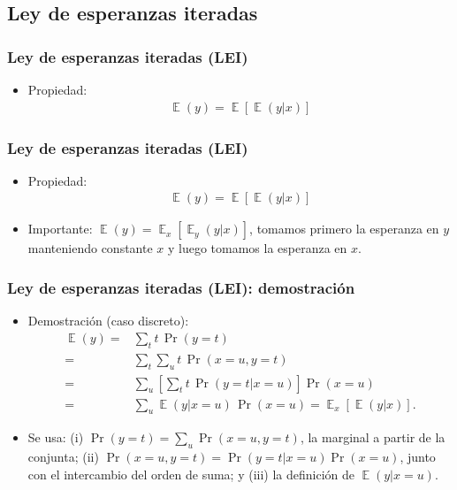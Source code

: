 \documentclass[t, compress, spanish, aspectratio=169]{beamer}
\DeclareMathOperator{\E}{\mathbb{E}}
\begin{document}
    \subsection{Ley de esperanzas iteradas}
    \begin{frame}
        \frametitle{Ley de esperanzas iteradas (LEI)}
        \begin{itemize}
            \item <1-> Propiedad:
            \begin{align*}
            \E(y)=\E[\E(y|x)]
            \end{align*}
        \end{itemize}
    \end{frame}
    
    \begin{frame}
        \frametitle{Ley de esperanzas iteradas (LEI)}
        \begin{itemize}
            \item Propiedad:
            \begin{align*}
            \E(y)=\E[\E(y|x)]
            \end{align*}
            \bigskip
            \item []  Importante: $\E(y)=\E_x[\E_y(y|x)]$, tomamos primero la esperanza en $y$ manteniendo constante $x$ y luego tomamos la esperanza en $x$.
        \end{itemize}
    \end{frame}

    \begin{frame}
        \frametitle{Ley de esperanzas iteradas (LEI): demostraci\'on}
        \small
        \begin{itemize}
            \item [] Demostraci\'on (caso discreto):
            \begin{align*}
            \E(y) = & \sum_t t \, \Pr(y=t) \\
                  = & \sum_t \sum_u t \, \Pr(x=u,y=t) \\
                  = & \sum_u \left[\sum_t t \, \Pr(y=t|x=u)\right] \Pr(x=u) \\
                  = & \sum_u \E(y|x=u) \, \Pr(x=u) = \E_x[\E(y|x)].
            \end{align*}
            \item [] Se usa: (i) $\Pr(y=t)=\sum_u \Pr(x=u,y=t)$, la marginal a partir de la conjunta; (ii) $\Pr(x=u,y=t)=\Pr(y=t|x=u)\Pr(x=u)$, junto con el intercambio del orden de suma; y (iii) la definici\'on de $\E(y|x=u)$.
        \end{itemize}
    \end{frame}
        
\end{document}
